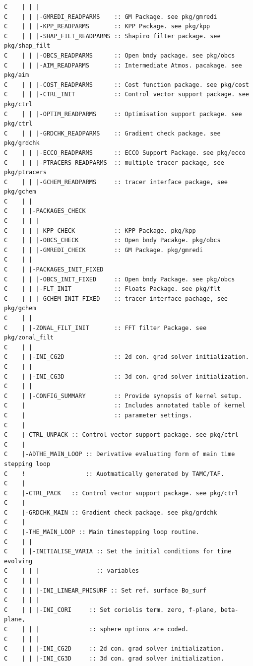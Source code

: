 {\begin{verbatim}
C    | | |
C    | | |-GMREDI_READPARMS    :: GM Package. see pkg/gmredi
C    | | |-KPP_READPARMS       :: KPP Package. see pkg/kpp
C    | | |-SHAP_FILT_READPARMS :: Shapiro filter package. see pkg/shap_filt
C    | | |-OBCS_READPARMS      :: Open bndy package. see pkg/obcs
C    | | |-AIM_READPARMS       :: Intermediate Atmos. pacakage. see pkg/aim
C    | | |-COST_READPARMS      :: Cost function package. see pkg/cost
C    | | |-CTRL_INIT           :: Control vector support package. see pkg/ctrl
C    | | |-OPTIM_READPARMS     :: Optimisation support package. see pkg/ctrl 
C    | | |-GRDCHK_READPARMS    :: Gradient check package. see pkg/grdchk
C    | | |-ECCO_READPARMS      :: ECCO Support Package. see pkg/ecco
C    | | |-PTRACERS_READPARMS  :: multiple tracer package, see pkg/ptracers
C    | | |-GCHEM_READPARMS     :: tracer interface package, see pkg/gchem
C    | |
C    | |-PACKAGES_CHECK
C    | | |
C    | | |-KPP_CHECK           :: KPP Package. pkg/kpp
C    | | |-OBCS_CHECK          :: Open bndy Pacakge. pkg/obcs
C    | | |-GMREDI_CHECK        :: GM Package. pkg/gmredi
C    | |
C    | |-PACKAGES_INIT_FIXED
C    | | |-OBCS_INIT_FIXED     :: Open bndy Package. see pkg/obcs
C    | | |-FLT_INIT            :: Floats Package. see pkg/flt
C    | | |-GCHEM_INIT_FIXED    :: tracer interface pachage, see pkg/gchem
C    | |
C    | |-ZONAL_FILT_INIT       :: FFT filter Package. see pkg/zonal_filt
C    | |
C    | |-INI_CG2D              :: 2d con. grad solver initialization.
C    | |
C    | |-INI_CG3D              :: 3d con. grad solver initialization.
C    | |
C    | |-CONFIG_SUMMARY        :: Provide synopsis of kernel setup.
C    |                         :: Includes annotated table of kernel 
C    |                         :: parameter settings.
C    |
C    |-CTRL_UNPACK :: Control vector support package. see pkg/ctrl
C    |
C    |-ADTHE_MAIN_LOOP :: Derivative evaluating form of main time stepping loop
C    !                 :: Auotmatically generated by TAMC/TAF.
C    |
C    |-CTRL_PACK   :: Control vector support package. see pkg/ctrl
C    |
C    |-GRDCHK_MAIN :: Gradient check package. see pkg/grdchk
C    |
C    |-THE_MAIN_LOOP :: Main timestepping loop routine.
C    | |
C    | |-INITIALISE_VARIA :: Set the initial conditions for time evolving 
C    | | |                :: variables
C    | | |
C    | | |-INI_LINEAR_PHISURF :: Set ref. surface Bo_surf
C    | | |
C    | | |-INI_CORI     :: Set coriolis term. zero, f-plane, beta-plane,
C    | | |              :: sphere options are coded.
C    | | |
C    | | |-INI_CG2D     :: 2d con. grad solver initialization.
C    | | |-INI_CG3D     :: 3d con. grad solver initialization.

\end{verbatim}}
